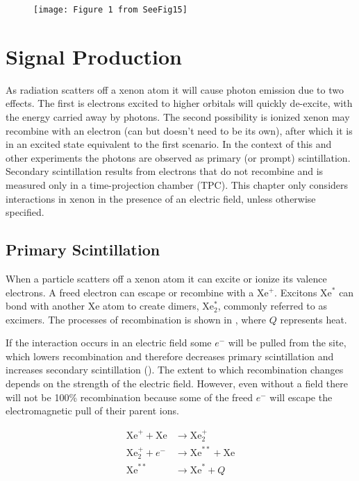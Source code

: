 \begin{figure}
\centering
\texttt{[image: Figure 1 from SeeFig15]}
\end{figure}



\section{Signal Production}
\label{sec:scintillation}
As radiation scatters off a xenon atom it will cause photon emission due to two effects.  The first is electrons excited to
higher orbitals will quickly de-excite, with the energy carried away by photons.  The second possibility is ionized xenon may
recombine with an
electron (can but doesn't need to be its own), after which it is in an excited state equivalent to the first scenario.  In the
context of this and other experiments the photons are observed as primary (or prompt) scintillation.  Secondary scintillation results from
electrons that do not recombine and is measured only in a time-projection
chamber (TPC).  This chapter only considers interactions in xenon in the presence of an electric field, unless otherwise
specified.



\subsection{Primary Scintillation}
\label{subsec:primary}
When a particle scatters off a xenon atom it can excite or ionize its valence electrons.  A freed electron can escape or recombine with a
Xe$^{+}$.  Excitons Xe$^{*}$ can bond with another Xe atom to create
dimers, Xe$_{2}^{*}$, commonly referred to as excimers.  The processes of recombination is shown in , where $Q$
represents heat.

If the interaction occurs in an electric field some $e^{-}$ will be pulled from the site, which lowers recombination and therefore
decreases primary
scintillation and increases secondary scintillation ().  The extent to which recombination changes depends on the
strength of the electric
field.  However, even without a field there will not be
100\% recombination because some of the freed $e^{-}$ will escape the electromagnetic pull of their parent ions.

\begin{subequations}
\begin{align}
\mathrm{Xe}^{+} + \mathrm{Xe} &\rightarrow \mathrm{Xe}_{2}^{+} \\
\mathrm{Xe}_{2}^{+} + e^{-} &\rightarrow \mathrm{Xe}^{**} + \mathrm{Xe} \\
\mathrm{Xe}^{**} &\rightarrow \mathrm{Xe}^{*} + Q
\end{align}
\label{eq:recomb}
\end{subequations}

